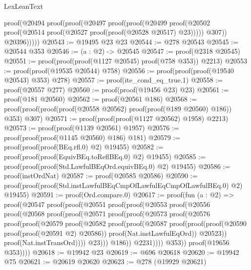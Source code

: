 \begin{lexlean}{LexLeanText}
\begin{coremodule}
        proof(@20494
            proof(proof(@20497
                  proof(proof(@20499
                        proof(@20502 proof(@20514 proof(@20527 proof(proof(@20528 @20517) @23)))))
                      @307))
                @20396)))))
@20543 := @19495 @23 @23
@20544 := @278 @20543
@20545 := @20544 @353
@20546 := (a : @2) -> @20545
@20547 := proof(@2318 @20545)
@20551 := proof(proof(proof(@1127 @20545) proof(@758 @353)) @2213)
@20553 := proof(proof(@19535 @20544) @758)
@20556 := proof(proof(proof(@19540 @20543) @353) @278)
@20557 := proof(ite_cond_eq_true.{1})
@20558 := proof(@20557 @277)
@20560 := proof(proof(@19456 @23) @23)
@20561 := proof(@181 @20560)
@20562 := proof(@20561 @186)
@20568 := proof(proof(proof(proof(@20558 @20562) proof(proof(@189 @20560) @186)) @353) @307)
@20571 := proof(proof(proof(@1127 @20562) @1958) @2213)
@20573 := proof(proof(@1139 @20561) @1957)
@20576 := proof(proof(proof(@1145 @20560) @186) @181)
@20579 := proof(proof(proof(BEq.rfl.{0}) @2) @19455)
@20582 := proof(proof(proof(EquivBEq.toReflBEq.{0}) @2) @19455)
@20585 := proof(proof(proof(Std.LawfulBEqOrd.equivBEq.{0}) @2) @19455)
@20586 := proof(instOrdNat)
@20587 := proof(@20585 @20586)
@20590 := proof(proof(proof(Std.instLawfulBEqCmpOfLawfulEqCmpOfLawfulBEq.{0}) @2) @19455)
@20591 := proof(Ord.compare.{0})
@20617 := proof(fun (a : @2) =>
    proof(@20547
        proof(proof(@20551
              proof(proof(@20553
                    proof(@20556
                        proof(@20568
                            proof(proof(@20571
                                  proof(proof(@20573
                                        proof(@20576
                                            proof(proof(@20579
                                                  proof(@20582
                                                      proof(proof(@20587
                                                            proof(proof(proof(@20590
                                                                    proof(proof(@20591 @2) @20586))
                                                                  proof(Nat.instLawfulEqOrd))
                                                                @20523))
                                                          proof(Nat.instTransOrd))))
                                                @23)))
                                      @186))
                                @2231))))
                  @353))
            proof(@19656 @353))))
@20618 := @19942 @23
@20619 := @696 @20618
@20620 := @19942 @75
@20621 := @20619 @20620
@20623 := @278 (@19929 @20621)

\end{coremodule}
\end{lexlean}
